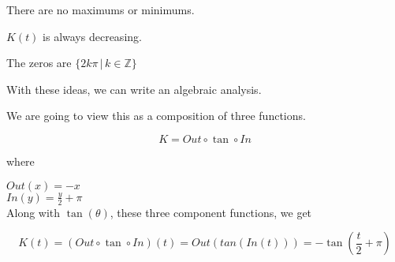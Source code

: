 \documentclass{ximera}
\begin{document}
\begin{idea}
\begin{image}
\end{image}

There are no maximums or minimums.

$K(t)$ is always decreasing.

The zeros are $\{  2 k \pi \, | \, k \in \mathbb{Z}    \}$


With these ideas, we can write an algebraic analysis.\\


\end{idea}












\begin{template}


We are going to view this as a composition of three functions.


\[
K = Out \circ \tan \circ In
\]


where


$Out(x) = -x$ \\


$In(y) = \frac{y}{2} + \pi$ \\




Along with $\tan(\theta)$, these three component functions, we get



\[
K(t) = (Out \circ \tan \circ In)(t) = Out(tan(In(t)))  = -\tan\left( \frac{t}{2} + \pi \right)
\]




\end{template}
\end{document}
